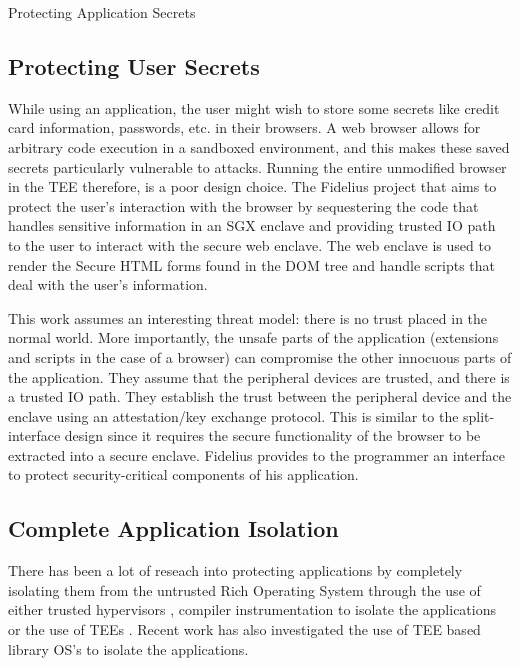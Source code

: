 \begin{subsection}{Protecting Application Secrets}
\subsection{Protecting User Secrets}
While using an application, the user might wish to store some secrets like
credit card information, passwords, etc. in their browsers. A web browser allows
for arbitrary code execution in a sandboxed environment, and this makes these
saved secrets particularly vulnerable to attacks. Running the entire unmodified
browser in the TEE therefore, is a poor design choice. The Fidelius
\cite{Fidelius_SP2018} project that aims to protect the user's interaction with
the browser by sequestering the code that handles sensitive information in an
SGX enclave and providing trusted IO path to the user to interact with the
secure web enclave. The web enclave is used to render the Secure HTML forms
found in the DOM tree and handle scripts that deal with the user's information. 

This work assumes an interesting threat model: there is no trust placed in the
normal world. More importantly, the unsafe parts of the application (extensions
and scripts in the case of a browser) can compromise the other innocuous parts
of the application. They assume that the peripheral devices are trusted, and
there is a trusted IO path. They establish the trust between the peripheral
device and the enclave using an attestation/key exchange protocol. This is
similar to the split-interface design since it requires the secure functionality
of the browser to be extracted into a secure enclave. Fidelius provides to the
programmer an interface to protect security-critical components of his
application. 
    
  
\subsection{Complete Application Isolation}
There has been a lot of reseach into protecting applications by completely
isolating them from the untrusted Rich Operating System through the use of
either trusted hypervisors \cite{hofmann2013inktag,SP3,chen2008overshadow},
compiler instrumentation to isolate the applications \cite{criswell2014virtual}
or the use of TEEs \cite{baumann2015shielding,guan17trustshadow}. Recent work
\cite{TsaiGraphene2014, tsai2017graphene} has also investigated the use of TEE
based library OS's to isolate the applications. 


\end{subsection}

